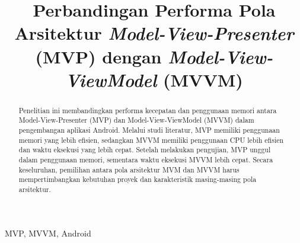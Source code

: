\documentclass[conference]{IEEEtran}
\begin{document}
	
	\title{Perbandingan Performa Pola Arsitektur \textit{Model-View-Presenter} (MVP) dengan \textit{Model-View-ViewModel} (MVVM)\\
	}
	
	\author{
		\and
		\and
		\and
	}
	
	\maketitle
	
	\begin{abstract}
		Penelitian ini membandingkan performa kecepatan dan penggunaan memori antara Model-View-Presenter (MVP) dan Model-View-ViewModel (MVVM) dalam pengembangan aplikasi Android. Melalui studi literatur, MVP memiliki penggunaan memori yang lebih efisien, sedangkan MVVM memiliki penggunaan CPU lebih efisien dan waktu eksekusi yang lebih cepat. Setelah melakukan pengujian, MVP unggul dalam penggunaan memori, sementara waktu eksekusi MVVM lebih cepat. Secara keseluruhan, pemilihan antara pola arsitektur MVM dan MVVM harus mempertimbangkan kebutuhan proyek dan karakteristik masing-masing pola arsitektur.
	\end{abstract}
	
	\begin{IEEEkeywords}
		MVP, MVVM, Android
	\end{IEEEkeywords}
	
\end{document}
